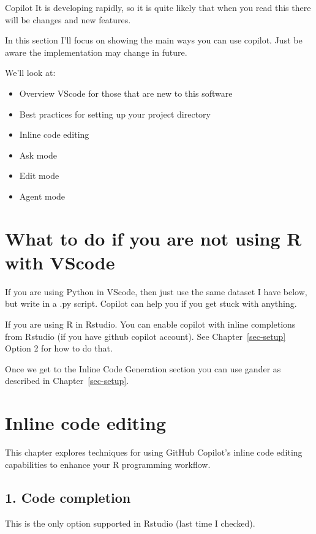 \documentclass[
  letterpaper,
  DIV=11,
  numbers=noendperiod]{scrreprt}
\providecommand{\tightlist}{%
  \setlength{\itemsep}{0pt}\setlength{\parskip}{0pt}}\usepackage{longtable,booktabs,array}
\begin{document}
Copilot It is developing rapidly, so it is quite likely that when you
read this there will be changes and new features.

In this section I'll focus on showing the main ways you can use copilot.
Just be aware the implementation may change in future.

We'll look at:

\begin{itemize}
\tightlist
\item
  Overview VScode for those that are new to this software
\item
  Best practices for setting up your project directory
\item
  Inline code editing
\item
  Ask mode
\item
  Edit mode
\item
  Agent mode
\end{itemize}

\section{What to do if you are not using R with
VScode}\label{what-to-do-if-you-are-not-using-r-with-vscode}

If you are using Python in VScode, then just use the same dataset I have
below, but write in a .py script. Copilot can help you if you get stuck
with anything.

If you are using R in Rstudio. You can enable copilot with inline
completions from Rstudio (if you have github copilot account). See
Chapter~\ref{sec-setup} Option 2 for how to do that.

Once we get to the Inline Code Generation section you can use gander as
described in Chapter~\ref{sec-setup}.

\section{Inline code editing}\label{inline-code-editing}

This chapter explores techniques for using GitHub Copilot's inline code
editing capabilities to enhance your R programming workflow.

\subsection{1. Code completion}\label{code-completion}

This is the only option supported in Rstudio (last time I checked).
\end{document}
